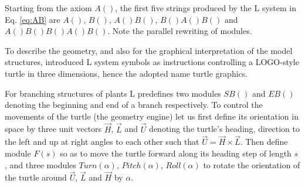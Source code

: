 Starting from the axiom $A()$,  the first five strings produced by the
L system  in Eq. \ref{eq:AB}  are $A()$, $B()$,  $A()B()$, $B()A()B()$
and $A()B()B()A()B()$. Note the parallel rewriting of modules.


To describe the geometry, and also for the graphical interpretation of
the  model structures,  \citet{pp:86} introduced  L system  symbols as
instructions  controlling a  LOGO-style  turtle \citep{abelson:82}  in
three dimensions, hence the adopted name turtle graphics.

For branching structures of plants L predefines two modules $SB()$ and
$EB()$ denoting  the beginning and  end of a branch  respectively.  To
control the movements of the turtle (the geometry engine) let us first
define its orientation in space  by three unit vectors $\vec H$, $\vec
L$ and $\vec  U$ denoting the turtle's heading,  direction to the left
and up at right angles to each other such that $\vec U = \vec H \times
\vec L$.  Then  define module $F(s)$ so as to  move the turtle forward
along   its  heading   step   of  length   $s$,   and  three   modules
$Turn(\alpha)$,   $Pitch(\alpha)$,   $Roll(\alpha)$   to  rotate   the
orientation of  the turtle around $\vec  U$, $\vec L$ and  $\vec H$ by
$\alpha$.  


